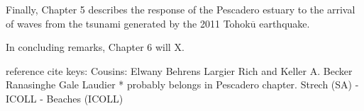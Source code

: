 Finally, Chapter 5 describes the response of the Pescadero estuary to the arrival of waves from the tsunami generated by the 2011 Tohok$\overline{\mathrm{u}}$ earthquake. 

In concluding remarks, Chapter 6 will X. 











reference cite keys:
Cousins: \cite{cousins_effects_2010,cousins_hydrodynamics_2011}
Elwany \cite{elwany_opening_1998}
Behrens \cite{behrens_characterization_2009,behrens_episodic_2013}
Largier \cite{largier_structure_1986,slinger_evolution_1990,largier_circulation_1991,largier_dynamics_1991,largier_stratified_1992,largier_tidal_1992,largier_seasonally_1997}
Rich and Keller \cite{rich_hydrologic_2013}
A. Becker \cite{becker_artificial_2009}
Ranasinghe \cite{ranasinghe_flushing_1998,ranasinghe_circulation_1999,ranasinghe_morphodynamic_1999,ranasinghe_seasonal_2003}
Gale \cite{gale_vertical_2006,gale_processes_2007}
Laudier \cite{laudier_measured_2011} * probably belongs in Pescadero chapter.
Strech (SA) - \cite{stretch_breaching_2006,parkinson_breaching_2007}
ICOLL - \cite{haines_morphometric_2006,baldock_morphodynamic_2008,davidson_simple_2009}
\cite{uncles_infragravity_2014}
Beaches (ICOLL)  \cite{weir_beach_2006}







